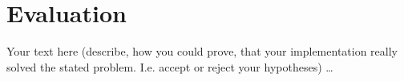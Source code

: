 \chapter{Evaluation}\label{chap:evaluation}
\chapterstart

Your text here (describe, how you could prove, that your implementation really solved the stated problem. I.e. accept or reject your hypotheses) \ldots

\chapterend

